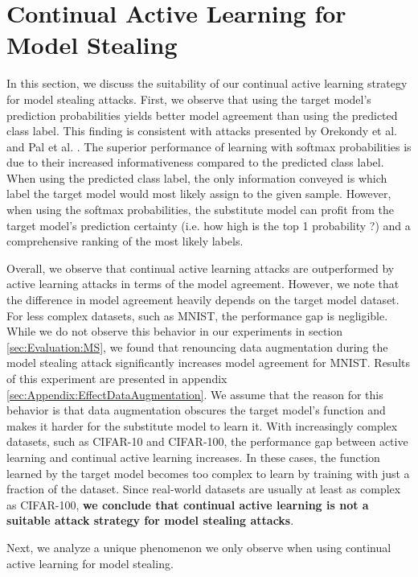 \section{Continual Active Learning for Model Stealing}
\label{sec:Discussion:ModelStealing}
In this section, we discuss the suitability of our continual active learning strategy for model stealing attacks. First, we observe that using the target model's
prediction probabilities yields better model agreement than using the predicted class label. This finding is consistent with attacks presented by Orekondy et al.
\cite{orekondy2019knockoff} and Pal et al. \cite{pal2020activethief}. The superior performance of learning with softmax probabilities is due to their increased
informativeness compared to the predicted class label. When using the predicted class label, the only information conveyed is which label the target model would 
most likely assign to the given sample. However, when using the softmax probabilities, the substitute model can profit from the target model's prediction certainty
(i.e. how high is the top 1 probability ?) and a comprehensive ranking of the most likely labels. \par
Overall, we observe that continual active learning attacks are outperformed by active learning attacks in terms of the model agreement. However, we note that the
difference in model agreement heavily depends on the target model dataset. For less complex datasets, such as MNIST, the performance gap is negligible. While
we do not observe this behavior in our experiments in section \ref{sec:Evaluation:MS}, we found that renouncing data augmentation during the model stealing attack
significantly increases model agreement for MNIST. Results of this experiment are presented in
appendix \ref{sec:Appendix:EffectDataAugmentation}. We assume that the reason for this behavior is that data augmentation obscures the target model's function
and makes it harder for the substitute model to learn it. With increasingly complex datasets, such as CIFAR-10 and CIFAR-100, the performance gap between
active learning and continual active learning increases. In these cases, the function learned by the target model becomes too complex to learn by training with
just a fraction of the dataset. Since real-world datasets are usually at least as complex as CIFAR-100, \textbf{we conclude that continual active learning is not a suitable
attack strategy for model stealing attacks}. \par
Next, we analyze a unique phenomenon we only observe when using continual active learning for model stealing.
